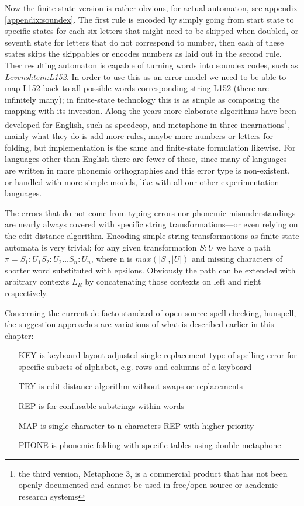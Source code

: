 \documentclass[a4paper,12pt]{article}
\begin{document}
Now the finite-state version is rather obvious, for actual automaton, see
appendix \ref{appendix:soundex}. The first rule is encoded by simply going from
start state to specific states for each six letters that might need to be
skipped when doubled, or seventh state for letters that do not correspond to
number, then each of these states skips the skippables or encodes numbers as
laid out in the second rule. Ther resulting automaton is capable of turning
words into soundex codes, such as \emph{Levenshtein:L152}. In order to use this
as an error model we need to be able to map L152 back to all possible words
corresponding string L152 (there are infinitely many); in finite-state
technology this is as simple as composing the mapping with its inversion. Along
the years more elaborate algorithms have been developed for English, such as
speedcop, and metaphone in three
incarnations\cite{philips1990hanging,philips2000double}\footnote{the third
version, Metaphone 3, is a commercial product that has not been openly
documented and cannot be used in free/open source or academic research
systems}, mainly what they do is add more rules, maybe more numbers or letters
for folding, but implementation is the same and finite-state formulation
likewise. For languages other than English there are fewer of these, since many
of languages are written in more phonemic orthographies and this error type is
non-existent, or handled with more simple models, like with all our other
experimentation languages.

The errors that do not come from typing errors nor phonemic misunderstandings
are nearly always covered with specific string transformations---or even relying
on the edit distance algorithm. Encoding simple string transformations as
finite-state automata is very trivial; for any given transformation $S:U$ we
have a path $\pi = S_1:U_1 S_2:U_2 \ldots S_n:U_n$, where n is $max(|S|, |U|)$
and missing characters of shorter word substituted with epsilons. Obviously
the path can be extended with arbitrary contexts $L _ R$ by concatenating those
contexts on left and right respectively. 

Concerning the current de-facto standard of open source spell-checking, 
hunspell, the suggestion approaches are variations of what is described earlier
in this chapter:

\begin{itemize}
    \item[KEY] is keyboard layout adjusted single replacement type of spelling
        error for specific subsets of alphabet, e.g. rows and columns of a
        keyboard
    \item[TRY] is edit distance algorithm without swaps or replacements
    \item[REP] is for confusable substrings within words
    \item[MAP] is single character to n characters REP with higher priority
    \item[PHONE] is phonemic folding with specific tables using double metaphone
\end{itemize}
\end{document}
